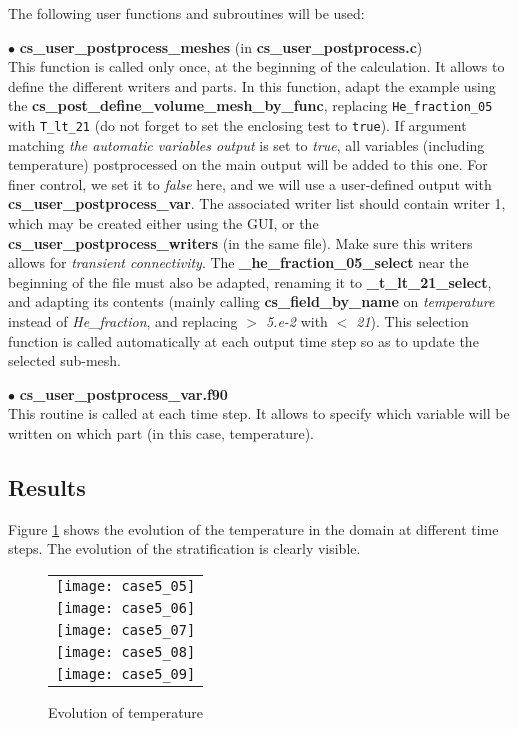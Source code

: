 The following user functions and subroutines will be used:

$\bullet$ {\bfseries cs\_user\_postprocess\_meshes} (in {\bfseries cs\_user\_postprocess.c})\\
This function is called only once, at the beginning of the calculation. It allows
to define the different writers and parts. In this function, adapt the example
using the {\bfseries cs\_post\_define\_volume\_mesh\_by\_func}, replacing \texttt{He\_fraction\_05}
with \texttt{T\_lt\_21} (do not forget to set the enclosing test to \texttt{true}).
If argument matching {\em the automatic variables output} is set
to {\em true}, all variables (including temperature) postprocessed on the main output will be added
to this one. For finer control, we set it to {\em false} here, and we will use a user-defined
output with {\bfseries cs\_user\_postprocess\_var}.
The associated writer list should contain writer 1, which may be created either using
the GUI, or the {\bfseries cs\_user\_postprocess\_writers} (in the same file). Make sure
this writers allows for {\em transient connectivity}.
The {\bfseries \_he\_fraction\_05\_select} near the beginning of the file must also
be adapted, renaming it to {\bfseries \_t\_lt\_21\_select}, and adapting its contents
(mainly calling {\bfseries cs\_field\_by\_name} on {\em temperature} instead of {\em He\_fraction},
and replacing {\em $>$ 5.e-2} with {\em $<$ 21}). This selection function is called automatically at each
output time step so as to update the selected sub-mesh.

$\bullet$ {\bfseries cs\_user\_postprocess\_var.f90}\\
This routine is called at each time step. It allows to specify which variable
will be written on which part (in this case, temperature).


        \subsection{Results}

Figure \ref{fige2_e5} shows the evolution of the temperature in the domain at
different time steps. The evolution of the stratification is clearly visible.


\begin{figure}
\begin{center}
\begin{tabular}{c}
\texttt{[image: case5\_05]} \\
\texttt{[image: case5\_06]} \\
\texttt{[image: case5\_07]} \\
\texttt{[image: case5\_08]} \\
\texttt{[image: case5\_09]} \\
\end{tabular}
\caption{Evolution of temperature}
\label{fige2_e5}
\end{center}
\end{figure}


